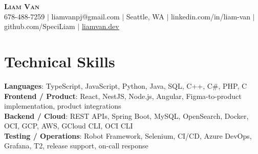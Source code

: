 \documentclass[letterpaper,11pt]{article}
\begin{document}

%
\begin{center}
    \textbf{\Huge \scshape Liam Van} \\ \vspace{1pt}
    \small 678-488-7259 $|$ liamvanpj@gmail.com $|$ Seattle, WA $|$
    linkedin.com/in/liam-van $|$ github.com/SpeciLiam $|$ \href{https://liamvan.dev}{liamvan.dev}

\end{center}

\section{Technical Skills}
 \begin{itemize}[leftmargin=0.15in, label={}]
    \small{\item{
     \textbf{Languages}{: TypeScript, JavaScript, Python, Java, SQL, C++, C\#, PHP, C} \\
     \textbf{Frontend / Product}{: React, NestJS, Node.js, Angular, Figma-to-product implementation, product integrations} \\
     \textbf{Backend / Cloud}{: REST APIs, Spring Boot, MySQL, OpenSearch, Docker, OCI, GCP, AWS, GCloud CLI, OCI CLI} \\
     \textbf{Testing / Operations}{: Robot Framework, Selenium, CI/CD, Azure DevOps, Grafana, T2, release support, on-call response} \\
    }}
 \end{itemize}
%

\end{document}
